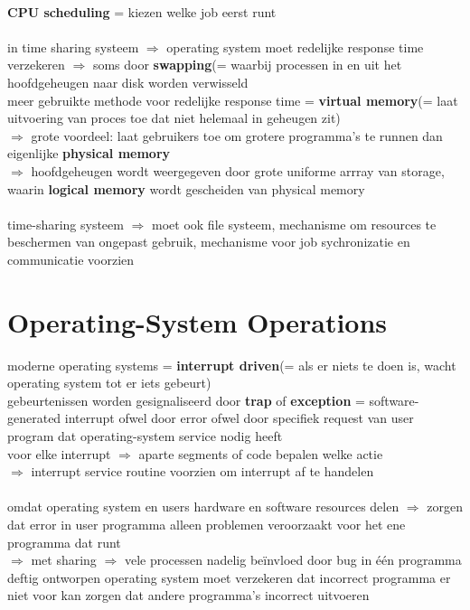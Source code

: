 \documentclass{report}
\begin{document}
\\\textbf{CPU scheduling} = kiezen welke job eerst runt 
\\
\\in time sharing systeem $\Rightarrow$ operating system moet redelijke response time verzekeren $\Rightarrow$ soms door \textbf{swapping}(= waarbij processen in en uit het hoofdgeheugen naar disk worden verwisseld
\\meer gebruikte methode voor redelijke response time = \textbf{virtual memory}(= laat uitvoering van proces toe dat niet helemaal in geheugen zit)
\\$\Rightarrow$ grote voordeel: laat gebruikers toe om grotere programma's te runnen dan eigenlijke \textbf{physical memory}
\\$\Rightarrow$ hoofdgeheugen wordt weergegeven door grote uniforme arrray van storage, waarin \textbf{logical memory} wordt gescheiden van physical memory
\\
\\time-sharing systeem $\Rightarrow$ moet ook file systeem, mechanisme om resources te beschermen van ongepast gebruik, mechanisme voor job sychronizatie en communicatie voorzien

\section{Operating-System Operations}
moderne operating systems = \textbf{interrupt driven}(= als er niets te doen is, wacht operating system tot er iets gebeurt)
\\gebeurtenissen worden gesignaliseerd door \textbf{trap} of \textbf{exception} = software-generated interrupt ofwel door error ofwel door specifiek request van user program dat operating-system service nodig heeft
\\voor elke interrupt $\Rightarrow$ aparte segments of code bepalen welke actie 
\\$\Rightarrow$ interrupt service routine voorzien om interrupt af te handelen
\\
\\omdat operating system en users hardware en software resources delen $\Rightarrow$ zorgen dat error in user programma alleen problemen veroorzaakt voor het ene programma dat runt
\\$\Rightarrow$ met sharing $\Rightarrow$ vele processen nadelig be\"invloed door bug in \'e\'en programma 
\\ deftig ontworpen operating system moet verzekeren dat incorrect programma er niet voor kan zorgen dat andere programma's incorrect uitvoeren
\end{document}
